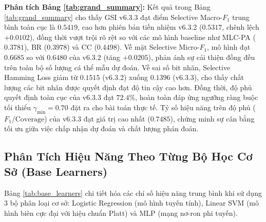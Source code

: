 \documentclass[10pt,a4paper,twoside]{article}
\begin{document}
\noindent\textbf{Phân tích Bảng \ref{tab:grand_summary}:}
Kết quả trong Bảng \ref{tab:grand_summary} cho thấy GSI v6.3.3 đạt điểm Selective Macro-$F_1$ trung bình toàn cục là $0.5419$, cao hơn phiên bản tiền nhiệm v6.3.2 ($0.5317$, chênh lệch $+0.0102$), đồng thời vượt trội rõ rệt so với các mô hình baseline như MLC-PA ($0.3781$), BR ($0.3978$) và CC ($0.4498$). Về mặt Selective Micro-$F_1$, mô hình đạt $0.6685$ so với $0.6480$ của v6.3.2 (tăng $+0.0205$), phản ánh sự cải thiện đồng đều trên toàn bộ số lượng cá thể mẫu dự đoán. Về sai số bit nhãn, Selective Hamming Loss giảm từ $0.1515$ (v6.3.2) xuống $0.1396$ (v6.3.3), cho thấy chất lượng các bit nhãn được quyết định đạt độ tin cậy cao hơn. Đồng thời, độ phủ quyết định toàn cục của v6.3.3 đạt $72.4\%$, hoàn toàn đáp ứng ngưỡng ràng buộc tối thiểu $\gamma_{\min} = 0.70$ đặt ra cho bài toán thực tế. Tỷ số hiệu năng trên độ phủ ($F_1/\text{Coverage}$) của v6.3.3 đạt giá trị cao nhất ($0.7485$), chứng minh sự cân bằng tối ưu giữa việc chấp nhận dự đoán và chất lượng phán đoán.

\subsection{Phân Tích Hiệu Năng Theo Từng Bộ Học Cơ Sở (Base Learners)}
Bảng \ref{tab:base_learners} chi tiết hóa các chỉ số hiệu năng trung bình khi sử dụng 3 bộ phân loại cơ sở: Logistic Regression (mô hình tuyến tính), Linear SVM (mô hình biên cực đại với hiệu chuẩn Platt) và MLP (mạng nơ-ron phi tuyến).
\end{document}
